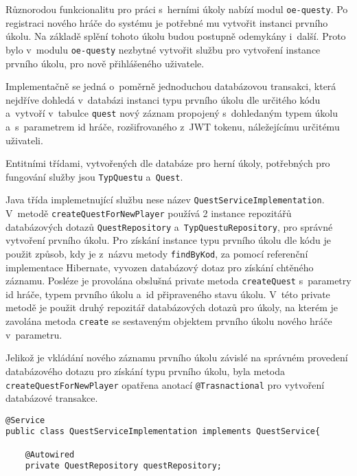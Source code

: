 \documentclass[twoside, 12pt]{article}
\begin{document}
{Různorodou funkcionalitu pro práci s~herními úkoly nabízí modul \texttt{oe-questy}.
Po registraci nového hráče do systému je potřebné mu vytvořit instanci prvního úkolu.
Na základě splění tohoto úkolu budou postupně odemykány i~další.
Proto bylo v~modulu \texttt{oe-questy} nezbytné vytvořit službu pro vytvoření instance prvního úkolu,
pro nově přihlášeného uživatele.

Implementačně se jedná o~poměrně jednoduchou databázovou transakci,
která nejdříve dohledá v~databázi instanci typu prvního úkolu dle určitého kódu a~vytvoří v~tabulce \texttt{quest}
nový záznam propojený s~dohledaným typem úkolu a~s~parametrem id hráče,
rozšifrovaného z~JWT tokenu, náležejícímu určitému uživateli.


Entitními třídami, vytvořených dle databáze pro herní úkoly,
potřebných pro fungování služby jsou \texttt{TypQuestu} a~\texttt{Quest}.


\obrazek
{}


Java třída implemetnující službu nese název \texttt{QuestServiceImplementation}.
V~metodě \texttt{createQuestForNewPlayer} používá 2 instance repozitářů databázových dotazů
\texttt{QuestRepository} a~\texttt{TypQuestuRepository}, pro správné vytvoření prvního úkolu.
Pro získání instance typu prvního úkolu dle kódu je použit způsob, kdy je z~názvu metody \texttt{findByKod},
za pomocí referenční implementace Hibernate, vyvozen databázový dotaz pro získání chtěného záznamu.
Posléze je provolána obslušná private metoda \texttt{createQuest} s~parametry id hráče, typem prvního úkolu a~id připraveného stavu úkolu.
V~této private metodě je použit druhý repozitář databázových dotazů pro úkoly,
na kterém je zavolána metoda \texttt{create} se sestaveným objektem prvního úkolu nového hráče v~parametru.

Jelikož je vkládání nového záznamu prvního úkolu závislé na správném provedení databázového dotazu pro získání typu prvního úkolu,
byla metoda\texttt{ createQuestForNewPlayer} opatřena anotací \texttt{@Trasnactional} pro vytvoření databázové transakce.

\begin{lstlisting}
@Service
public class QuestServiceImplementation implements QuestService{

    @Autowired
    private QuestRepository questRepository;


\end{lstlisting}}
\end{document}
